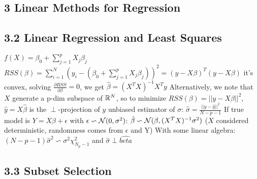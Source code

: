 \documentclass[9pt]{extarticle}
\begin{document}
\begin{multicols*}{2}
\section*{3 Linear Methods for Regression}

\subsection*{3.2 Linear Regression and Least Squares}

$f(X)=\beta_0+\sum_{j=1}^{p}X_j \beta_j$\nl
$RSS(\beta)=\sum_{i=1}^{N}(y_i-(\beta_0+\sum_{j=1}^{p}X_j \beta_j))^2=(y-X\beta)^T(y-X\beta)$\nl
it's convex, solving $\frac{\partial RSS}{\partial \beta}=0$, we get $\hat{\beta}=(X^TX)^{-1}X^Ty$\nl
Alternatively, we note that $X$ generate a p-dim subspace of $\mathbb{R}^N$, so to minimize $RSS(\beta)=||y-X\beta||^2$, $\hat{y}=X\hat{\beta}$ is the $\perp$-projection of $y$\nl
unbiased estimator of $\sigma$: $\hat{\sigma}=\frac{||y-\hat{y}||^2}{N-p-1}$\nl
If true model is $Y=X\beta + \epsilon$ with $\epsilon \backsim \mathcal{N}(0,\sigma^2)$:
$\hat{\beta} \backsim \mathcal{N}(\beta,(X^TX)^{-1}\sigma^2)$ ($X$ considered deterministic, randomness comes from $\epsilon$ and Y)\nl
With some linear algebra:$(N-p-1)\hat{\sigma}^2\backsim \sigma^2 \chi^2_{N_p-1}$ and $\hat{\sigma} \perp \hat{beta}$


\subsection*{3.3 Subset Selection}

\end{multicols*}
\end{document}
